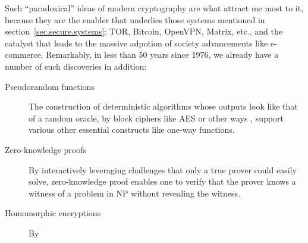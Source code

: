 \documentclass{article}
\begin{document}
Such ``paradoxical'' ideas of modern cryptography are what attract me most to
it, because they are the enabler that underlies those systems mentioned in
section~\ref{sec.secure.systems}: TOR, Bitcoin, OpenVPN, Matrix, etc., and the
catalyst that leads to the massive adpotion of society advancements like
e-commerce. Remarkably, in less than 50 years since 1976, we already have a
number of such discoveries in addition:
\begin{description}
\item[Pseudorandom functions] The construction of deterministic algorithms
	whose outputs look like that of a random oracle, by block ciphers like
	AES\cite{aes} or other ways \cite{pseudo.rand.cons.2}, support various
	other essential constructs like one-way functions.

\item[Zero-knowledge proofs] By interactively leveraging challenges that only a
	true prover could easily solve, zero-knowledge proof \cite{zero.knowledge}
	enables one to verify that the prover knows a witness of a problem in NP
	\cite{zero.knowledge.np} without revealing the witness.

\item[Homomorphic encryptions] By 
\end{description}



\end{document}
